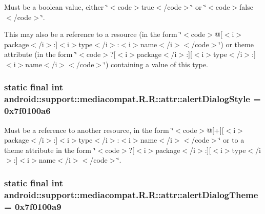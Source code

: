 Must be a boolean value, either \char`\"{}$<$code$>$true$<$/code$>$\char`\"{} or \char`\"{}$<$code$>$false$<$/code$>$\char`\"{}. 

This may also be a reference to a resource (in the form \char`\"{}$<$code$>$@\mbox{[}$<$i$>$package$<$/i$>$:\mbox{]}$<$i$>$type$<$/i$>$:$<$i$>$name$<$/i$>$$<$/code$>$\char`\"{}) or theme attribute (in the form \char`\"{}$<$code$>$?\mbox{[}$<$i$>$package$<$/i$>$:\mbox{]}\mbox{[}$<$i$>$type$<$/i$>$:\mbox{]}$<$i$>$name$<$/i$>$$<$/code$>$\char`\"{}) containing a value of this type. \hypertarget{classandroid_1_1support_1_1mediacompat_1_1_r_1_1attr_6a116cb75176bdb9562730dd03428d56}{
\subsubsection[{alertDialogStyle}]{\setlength{\rightskip}{0pt plus 5cm}static final int android::support::mediacompat.R.R::attr::alertDialogStyle = 0x7f0100a6}}
\label{classandroid_1_1support_1_1mediacompat_1_1_r_1_1attr_6a116cb75176bdb9562730dd03428d56}


Must be a reference to another resource, in the form \char`\"{}$<$code$>$@\mbox{[}+\mbox{]}\mbox{[}$<$i$>$package$<$/i$>$:\mbox{]}$<$i$>$type$<$/i$>$:$<$i$>$name$<$/i$>$$<$/code$>$\char`\"{} or to a theme attribute in the form \char`\"{}$<$code$>$?\mbox{[}$<$i$>$package$<$/i$>$:\mbox{]}\mbox{[}$<$i$>$type$<$/i$>$:\mbox{]}$<$i$>$name$<$/i$>$$<$/code$>$\char`\"{}. \hypertarget{classandroid_1_1support_1_1mediacompat_1_1_r_1_1attr_1f5171e414a8b6b28364214e008121c3}{
\subsubsection[{alertDialogTheme}]{\setlength{\rightskip}{0pt plus 5cm}static final int android::support::mediacompat.R.R::attr::alertDialogTheme = 0x7f0100a9}}
\label{classandroid_1_1support_1_1mediacompat_1_1_r_1_1attr_1f5171e414a8b6b28364214e008121c3}


